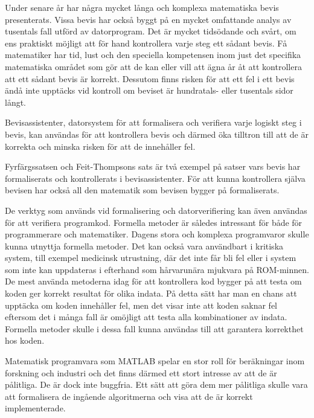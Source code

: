Under senare år har några mycket långa och komplexa matematiska bevis
presenterats. Vissa bevis har också byggt på en mycket omfattande analys av
tusentals fall utförd av datorprogram. Det är mycket tidsödande och svårt, om
ens praktiskt möjligt att för hand kontrollera varje steg ett sådant bevis. Få
matematiker har tid, lust och den speciella kompetensen inom just det specifika
matematiska området som gör att de kan eller vill att ägna år åt att
kontrollera att ett sådant bevis är korrekt. Dessutom finns risken för att ett
fel i ett bevis ändå inte upptäcks vid kontroll om beviset är hundratals- eller
tusentals sidor långt.\cite{harrison2008formal}

Bevisassistenter, datorsystem för att formalisera och verifiera varje logiskt
steg i bevis, kan användas för att kontrollera bevis och därmed öka tilltron
till att de är korrekta och minska risken för att de innehåller fel.

Fyrfärgssatsen\cite{gonthier2008formal} och Feit-Thompsons
sats\cite{aschbacher2004status} är två exempel på satser vars bevis har
formaliserats och kontrollerats i bevisassistenter. För att kunna kontrollera
själva bevisen har också all den matematik som bevisen bygger på formaliserats.

De verktyg som används vid formalisering och datorverifiering kan även användas
för att verifiera programkod. Formella metoder är således intressant för både
för programmerare och matematiker.
Dagens stora och komplexa programvaror skulle kunna utnyttja formella metoder.
Det kan också vara användbart i
kritiska system, till exempel medicinsk utrustning,  där det inte får bli fel
eller i system som inte kan uppdateras i efterhand som hårvarunära mjukvara
på ROM-minnen. De mest använda metoderna idag för
att kontrollera kod bygger på att testa om koden ger korrekt resultat för olika
indata. På detta sätt har man en chans att upptäcka om koden innehåller fel,
men det visar inte att koden saknar fel eftersom det i många fall är omöjligt
att testa alla kombinationer av indata.
Formella metoder skulle i dessa fall
kunna användas till att garantera korrekthet hos koden.

Matematisk programvara som MATLAB spelar en stor roll för beräkningar inom
forskning och industri och det finns därmed ett stort intresse av att de är
pålitliga. De är dock inte buggfria. Ett sätt att göra dem mer pålitliga skulle
vara att formalisera de ingående algoritmerna och visa att de är korrekt
implementerade.\cite{mortberg2012}


